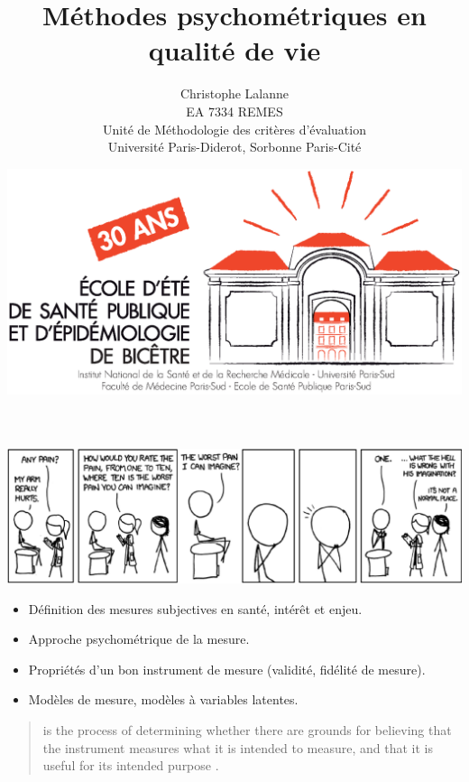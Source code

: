 

\title{Méthodes psychométriques en qualité de vie}
\author{Christophe Lalanne\\EA 7334 REMES\\ Unité de Méthodologie des critères d’évaluation\\Université Paris-Diderot, Sorbonne Paris-Cité\\}
\date{\includegraphics[height=18ex]{logo.eps}}




\LogoOff
\maketitle
\rightfooter{\quad\textsf{\thepage}}


\foilhead{}

\bigskip
{\centering \includegraphics[width=\textwidth]{figs/pain.eps}\par}


\begin{itemize}
\item Définition des mesures subjectives en santé, intérêt et enjeu.
\item Approche psychométrique de la mesure.
\item Propriétés d'un bon instrument de mesure (validité, fidélité de mesure).
\item Modèles de mesure, modèles à variables latentes.
\end{itemize}

\begin{quote}
   is the process of determining
  whether there are grounds for believing that the instrument measures
  what it is intended to measure, and that it is useful for its
  intended purpose \autocite{Fayers2000}.
\end{quote}

